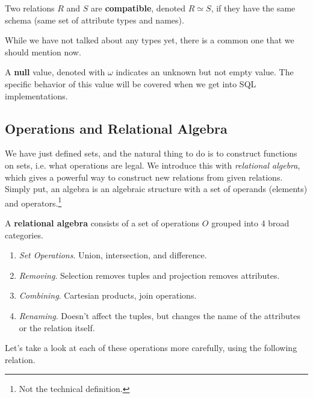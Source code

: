 \documentclass{article}
\begin{document}
    \begin{definition}[Compatiblity]
      Two relations $R$ and $S$ are \textbf{compatible}, denoted $R \simeq S$, if they have the same schema (same set of attribute types and names). 
    \end{definition}

    While we have not talked about any types yet, there is a common one that we should mention now. 

    \begin{definition}[Null]
      A \textbf{null} value, denoted with $\omega$ indicates an unknown but not empty value. The specific behavior of this value will be covered when we get into SQL implementations. 
    \end{definition}

  \subsection{Operations and Relational Algebra}

      We have just defined sets, and the natural thing to do is to construct functions on sets, i.e. what operations are legal. We introduce this with \textit{relational algebra}, which gives a powerful way to construct new relations from given relations. Simply put, an algebra is an algebraic structure with a set of operands (elements) and operators.\footnote{Not the technical definition.}

      \begin{definition} 
        A \textbf{relational algebra} consists of a set of operations $O$ grouped into 4 broad categories. 
        \begin{enumerate}
          \item \textit{Set Operations}. Union, intersection, and difference. 
          \item \textit{Removing}. Selection removes tuples and projection removes attributes. 
          \item \textit{Combining}. Cartesian products, join operations. 
          \item \textit{Renaming}. Doesn't affect the tuples, but changes the name of the attributes or the relation itself. 
        \end{enumerate}
      \end{definition}

      Let's take a look at each of these operations more carefully, using the following relation. 
\end{document}
